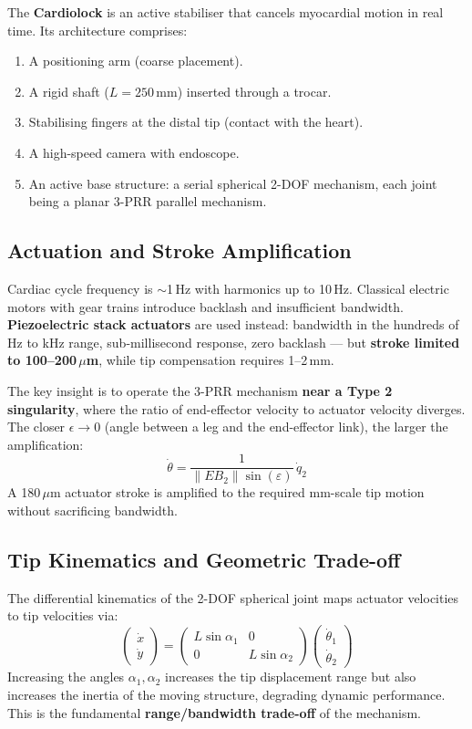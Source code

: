 \documentclass[11pt,a4paper,twoside]{report}
\begin{document}
The \textbf{Cardiolock} is an active stabiliser that cancels myocardial motion in real time. Its architecture comprises:
\begin{enumerate}
    \item A positioning arm (coarse placement).
    \item A rigid shaft ($L = 250$\,mm) inserted through a trocar.
    \item Stabilising fingers at the distal tip (contact with the heart).
    \item A high-speed camera with endoscope.
    \item An active base structure: a serial spherical 2-DOF mechanism, each joint being a planar 3-PRR parallel mechanism.
\end{enumerate}

\subsection{Actuation and Stroke Amplification}
Cardiac cycle frequency is $\sim$1\,Hz with harmonics up to 10\,Hz. Classical electric motors with gear trains introduce backlash and insufficient bandwidth. \textbf{Piezoelectric stack actuators} are used instead: bandwidth in the hundreds of Hz to kHz range, sub-millisecond response, zero backlash — but \textbf{stroke limited to 100--200\,$\mu$m}, while tip compensation requires 1--2\,mm.

The key insight is to operate the 3-PRR mechanism \textbf{near a Type 2 singularity}, where the ratio of end-effector velocity to actuator velocity diverges. The closer $\epsilon \to 0$ (angle between a leg and the end-effector link), the larger the amplification:
\begin{equation}
    \dot{\theta} = \frac{1}{\|EB_2\|\sin(\varepsilon)}\,\dot{q}_2
\end{equation}
A 180\,$\mu$m actuator stroke is amplified to the required mm-scale tip motion without sacrificing bandwidth.

\subsection{Tip Kinematics and Geometric Trade-off}
The differential kinematics of the 2-DOF spherical joint maps actuator velocities to tip velocities via:
\begin{equation}
    \begin{pmatrix} \dot{x} \\ \dot{y} \end{pmatrix}
    =
    \begin{pmatrix} L\sin\alpha_1 & 0 \\ 0 & L\sin\alpha_2 \end{pmatrix}
    \begin{pmatrix} \dot{\theta}_1 \\ \dot{\theta}_2 \end{pmatrix}
\end{equation}
Increasing the angles $\alpha_1, \alpha_2$ increases the tip displacement range but also increases the inertia of the moving structure, degrading dynamic performance. This is the fundamental \textbf{range/bandwidth trade-off} of the mechanism.
\end{document}
